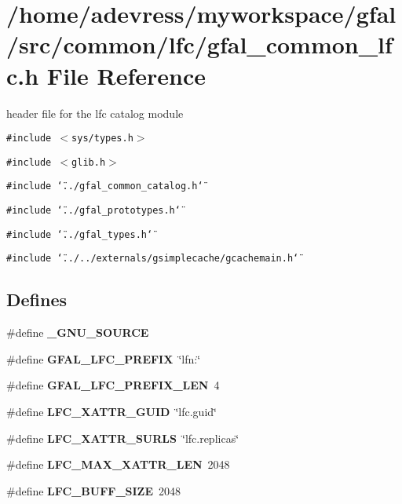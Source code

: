 \section{/home/adevress/myworkspace/gfal/src/common/lfc/gfal\_\-common\_\-lfc.h File Reference}
\label{gfal__common__lfc_8h}
header file for the lfc catalog module 

{\tt \#include $<$sys/types.h$>$}\par
{\tt \#include $<$glib.h$>$}\par
{\tt \#include \char`\"{}../gfal\_\-common\_\-catalog.h\char`\"{}}\par
{\tt \#include \char`\"{}../gfal\_\-prototypes.h\char`\"{}}\par
{\tt \#include \char`\"{}../gfal\_\-types.h\char`\"{}}\par
{\tt \#include \char`\"{}../../externals/gsimplecache/gcachemain.h\char`\"{}}\par
\subsection*{Defines}
\begin{CompactItemize}
\item 
\#define \textbf{\_\-GNU\_\-SOURCE}\label{gfal__common__lfc_8h_53abf256730d533302d1910e5fb61efe}

\item 
\#define \textbf{GFAL\_\-LFC\_\-PREFIX}~\char`\"{}lfn:\char`\"{}\label{gfal__common__lfc_8h_c00d877428b39b35b4f611656b2d5215}

\item 
\#define \textbf{GFAL\_\-LFC\_\-PREFIX\_\-LEN}~4\label{gfal__common__lfc_8h_0f0b96660a7e6440a6556909e7195109}

\item 
\#define \textbf{LFC\_\-XATTR\_\-GUID}~\char`\"{}lfc.guid\char`\"{}\label{gfal__common__lfc_8h_8f6afce6b30cd0685eaa45170f52c98e}

\item 
\#define \textbf{LFC\_\-XATTR\_\-SURLS}~\char`\"{}lfc.replicas\char`\"{}\label{gfal__common__lfc_8h_c1963dd5788b4452446d741e07e7f417}

\item 
\#define \textbf{LFC\_\-MAX\_\-XATTR\_\-LEN}~2048\label{gfal__common__lfc_8h_cb8d26c67c686b15d05f59def23e1356}

\item 
\#define \textbf{LFC\_\-BUFF\_\-SIZE}~2048\label{gfal__common__lfc_8h_90255f6e7148a56a2c09cc15098643d5}

\end{CompactItemize}
